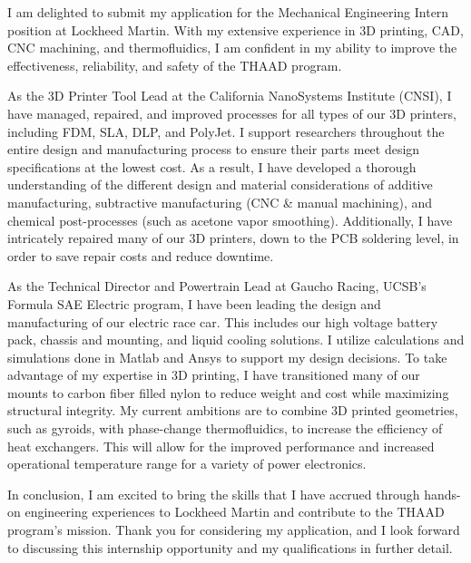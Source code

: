 \documentclass[11pt, letterpaper]{awesome-cv} %
\begin{document}
\makecvheader %

\makelettertitle %


\begin{cvletter}


I am delighted to submit my application for the Mechanical Engineering Intern position at Lockheed Martin. With my extensive experience in 3D printing, CAD, CNC machining, and thermofluidics, I am confident in my ability to improve the effectiveness, reliability, and safety of the THAAD program.

As the 3D Printer Tool Lead at the California NanoSystems Institute (CNSI), I have managed, repaired, and improved processes for all types of our 3D printers, including FDM, SLA, DLP, and PolyJet. I support researchers throughout the entire design and manufacturing process to ensure their parts meet design specifications at the lowest cost. As a result, I have developed a thorough understanding of the different design and material considerations of additive manufacturing, subtractive manufacturing (CNC \& manual machining), and chemical post-processes (such as acetone vapor smoothing). Additionally, I have intricately repaired many of our 3D printers, down to the PCB soldering level, in order to save repair costs and reduce downtime.

As the Technical Director and Powertrain Lead at Gaucho Racing, UCSB's Formula SAE Electric program, I have been leading the design and manufacturing of our electric race car. This includes our high voltage battery pack, chassis and mounting, and liquid cooling solutions. I utilize calculations and simulations done in Matlab and Ansys to support my design decisions. To take advantage of my expertise in 3D printing, I have transitioned many of our mounts to carbon fiber filled nylon to reduce weight and cost while maximizing structural integrity. My current ambitions are to combine 3D printed geometries, such as gyroids, with phase-change thermofluidics, to increase the efficiency of heat exchangers. This will allow for the improved performance and increased operational temperature range for a variety of power electronics.

In conclusion, I am excited to bring the skills that I have accrued through hands-on engineering experiences to Lockheed Martin and contribute to the THAAD program's mission. Thank you for considering my application, and I look forward to discussing this internship opportunity and my qualifications in further detail.


\end{cvletter}


\makeletterclosing %
\end{document}
